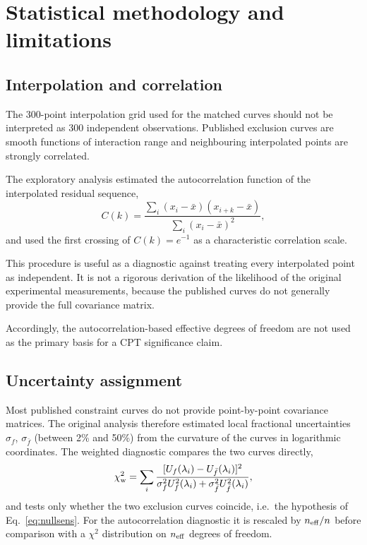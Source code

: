 \documentclass[aps,prd,reprint,superscriptaddress,nofootinbib]{revtex4-2}
\begin{document}
	\section{Statistical methodology and limitations}
	
	\subsection{Interpolation and correlation}
	
	The 300-point interpolation grid used for the matched curves should not
	be interpreted as 300 independent observations. Published exclusion
	curves are smooth functions of interaction range and neighbouring
	interpolated points are strongly correlated.
	
	The exploratory analysis estimated the autocorrelation function of the
	interpolated residual sequence,
	\begin{equation}
		C(k)
		=
		\frac{
			\sum_i(x_i-\bar x)(x_{i+k}-\bar x)
		}{
			\sum_i(x_i-\bar x)^2
		},
		\label{eq:ACF}
	\end{equation}
	and used the first crossing of $C(k)=e^{-1}$ as a characteristic
	correlation scale.
	
	This procedure is useful as a diagnostic against treating every
	interpolated point as independent. It is not a rigorous derivation of
	the likelihood of the original experimental measurements, because the
	published curves do not generally provide the full covariance matrix.
	
	Accordingly, the autocorrelation-based effective degrees of freedom are
	not used as the primary basis for a CPT significance claim.
	
	\subsection{Uncertainty assignment}
	
	Most published constraint curves do not provide point-by-point
	covariance matrices. The original analysis therefore estimated local fractional
uncertainties $\sigma_f$, $\sigma_{\bar f}$ (between 2\% and 50\%) from
the curvature of the curves in logarithmic coordinates. The weighted
diagnostic compares the two curves directly,
\begin{equation}
	\chi^2_{\rm w}
	=
	\sum_i
	\frac{
		[U_f(\lambda_i)-U_{\bar f}(\lambda_i)]^2
	}{
		\sigma_f^2U_f^2(\lambda_i)+\sigma_{\bar f}^2U_{\bar f}^2(\lambda_i)
	},
	\label{eq:chiweighted}
\end{equation}
and tests only whether the two exclusion curves coincide, i.e.\ the
hypothesis of Eq.~\eqref{eq:nullsens}. For the autocorrelation
diagnostic it is rescaled by $n_{\rm eff}/n$ before comparison with a
$\chi^2$ distribution on $n_{\rm eff}$ degrees of freedom.
	
\end{document}
